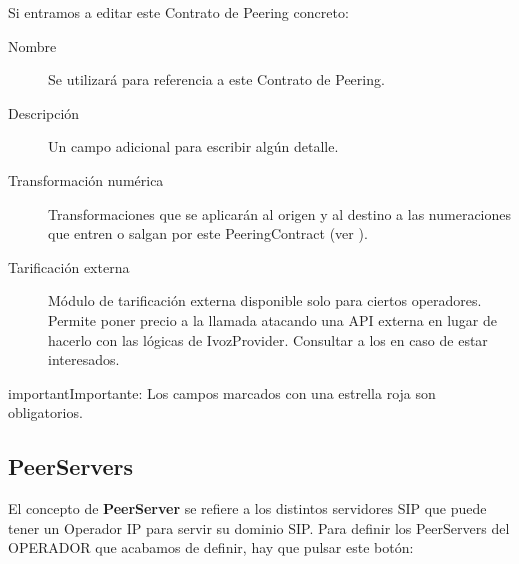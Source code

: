 \documentclass[letterpaper,10pt,spanish]{sphinxmanual}
\begin{document}

Si entramos a editar este Contrato de Peering concreto:

\begin{description}
\item[{Nombre}] \leavevmode{}\label{external_incoming_calls/peering_contracts:term-nombre}
Se utilizará para referencia a este Contrato de Peering.

\item[{Descripción}] \leavevmode{}\label{external_incoming_calls/peering_contracts:term-descripcion}
Un campo adicional para escribir algún detalle.

\item[{Transformación numérica}] \leavevmode{}\label{external_incoming_calls/peering_contracts:term-transformacion-numerica}
Transformaciones que se aplicarán al origen y al destino a las numeraciones que entren o salgan por este PeeringContract (ver {\hyperref[external_incoming_calls/numeric_transformations:numeric\string-transformations]{}}).

\item[{Tarificación externa}] \leavevmode{}\label{external_incoming_calls/peering_contracts:term-tarificacion-externa}
Módulo de tarificación externa disponible solo para ciertos operadores. Permite poner precio a la llamada atacando una API externa en lugar de hacerlo con las lógicas de IvozProvider. Consultar a los {\hyperref[intro/getting_help:getting\string-help]{}} en caso de estar interesados.

\end{description}

\begin{notice}{important}{Importante:}
Los campos marcados con una estrella roja son obligatorios.
\end{notice}


\subsection{PeerServers}
\label{external_incoming_calls/peering_contracts:peerservers}
El concepto de \textbf{PeerServer} se refiere a los distintos servidores SIP que puede tener un Operador IP para servir su dominio SIP. Para definir los PeerServers del OPERADOR que acabamos de definir, hay que pulsar este botón:
\end{document}
